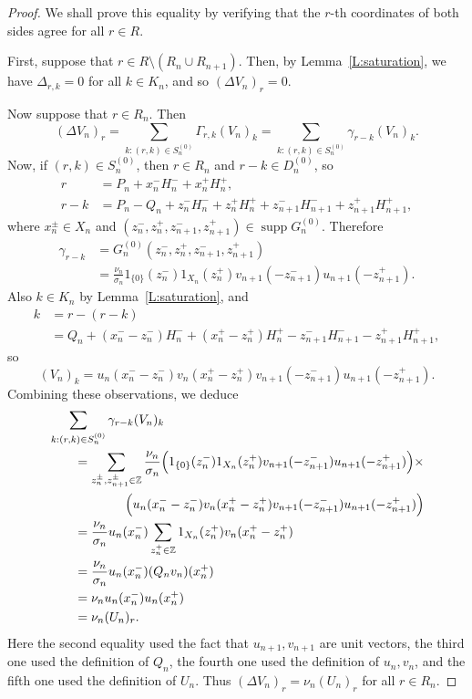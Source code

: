 \documentclass[11pt,reqno]{amsart}
\theoremstyle{plain}
\theoremstyle{definition}
\theoremstyle{remark}
\newcommand{\ZZ}{\mathbb{Z}}
\DeclareMathOperator{\supp}{supp}
\begin{document}
\begin{proof}
We shall prove this equality by verifying that the
$r$-th coordinates of both sides agree for all $r\in R$.

First, suppose that $r\in R\setminus(R_n\cup R_{n+1})$. 
Then, by Lemma~\ref{L:saturation}, we have $\Delta_{r,k}=0$ for all $k\in K_n$, and so $(\Delta V_n)_r=0$.


Now suppose that $r\in R_n$. Then
\[
(\Delta V_n)_r
=\sum_{k:(r,k)\in S_n^{(0)}}\Gamma_{r,k}(V_n)_k
=\sum_{k:(r,k)\in S_n^{(0)}}\gamma_{r-k} (V_n)_k.
\]
Now, if $(r,k)\in S_n^{(0)}$, then $r\in R_n$ and $r-k\in D_n^{(0)}$, so
\begin{align*}
r&=P_n+x_n^{-}H_n^-+x_n^+H_n^+,\\
r-k&=P_n-Q_n+z_n^-H_n^-+z_n^+H_n^++z_{n+1}^-H_{n+1}^-+z_{n+1}^+H_{n+1}^+,
\end{align*}
where $x_n^\pm\in X_n$ and $(z_n^-,z_n^+,z_{n+1}^-,z_{n+1}^+)\in\supp G_n^{(0)}$.
Therefore
\begin{align*}
\gamma_{r-k}
&=G_n^{(0)}(z_n^-,z_n^+,z_{n+1}^-,z_{n+1}^+)\\
&=\frac{\nu_n}{\sigma_n}1_{\{0\}}(z_n^-)1_{X_n}(z_n^+)v_{n+1}(-z_{n+1}^-)u_{n+1}(-z_{n+1}^+).
\end{align*}
Also $k\in K_n$ by Lemma~\ref{L:saturation}, and
\begin{align*}
k&=r-(r-k)\\
&=Q_n+(x_n^--z_n^-)H_n^-+(x_n^+-z_n^+)H_n^+-z_{n+1}^-H_{n+1}^--z_{n+1}^+H_{n+1}^+,
\end{align*}
so
\[ 
(V_n)_{k}=u_n(x_n^--z_n^-)v_n(x_n^+-z_n^+)v_{n+1}(-z_{n+1}^-)u_{n+1}(-z_{n+1}^+).
\]
Combining these observations, we deduce
\begin{align*}
&\sum_{k:(r,k)\in S_n^{(0)}}\gamma_{r-k} (V_n)_k\\
&\qquad=\sum_{z_n^\pm,z_{n+1}^\pm\in\ZZ}\frac{\nu_n}{\sigma_n}\Bigl(1_{\{0\}}(z_n^-)1_{X_n}(z_n^+)v_{n+1}(-z_{n+1}^-)u_{n+1}(-z_{n+1}^+)\Bigr)\times\\
&\qquad\qquad\qquad\Bigl(u_n(x_n^--z_n^-)v_n(x_n^+-z_n^+)v_{n+1}(-z_{n+1}^-)u_{n+1}(-z_{n+1}^+)\Bigr)\\
&\qquad=\frac{\nu_n}{\sigma_n}u_n(x_n^-)\sum_{z_n^+\in\ZZ}1_{X_n}(z_n^+)v_n(x_n^+-z_n^+)\\
&\qquad=\frac{\nu_n}{\sigma_n}u_n(x_n^-)(Q_nv_n)(x_n^+)\\
&\qquad=\nu_nu_n(x_n^-)u_n(x_n^+)\\
&\qquad=\nu_n(U_n)_r.
\end{align*}
Here
the second equality used the fact that $u_{n+1},v_{n+1}$ are unit vectors,
the third one used the definition of $Q_n$, the fourth one
used the definition of $u_n,v_n$, and the fifth one used the definition of $U_n$.
Thus $(\Delta V_n)_r=\nu_n(U_n)_r$ for all 
$r\in R_n$.


\end{proof}
\end{document}
